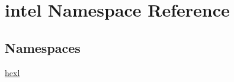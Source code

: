 \hypertarget{namespaceintel}{\section{intel Namespace Reference}
\label{namespaceintel}
}
\subsection*{Namespaces}
\begin{DoxyCompactItemize}
\item 
\hyperlink{namespaceintel_1_1hexl}{hexl}
\end{DoxyCompactItemize}
